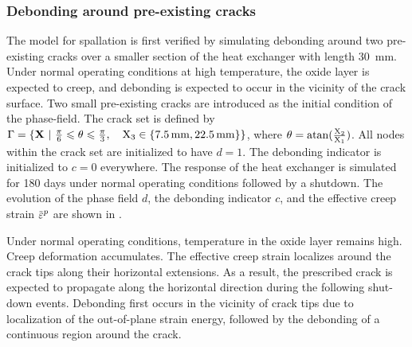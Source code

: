 

\subsubsection{Debonding around pre-existing cracks}

The model for spallation is first verified by simulating debonding around two pre-existing cracks over a smaller section of the heat exchanger with length \SI{30}{\milli\meter}. Under normal operating conditions at high temperature, the oxide layer is expected to creep, and debonding is expected to occur in the vicinity of the crack surface.
Two small pre-existing cracks are introduced as the initial condition of the phase-field. The crack set is defined by $\Gamma = \{ \textbf{X} \ \vert\ \frac{\pi}{6} \leqslant \theta \leqslant \frac{\pi}{3}, \quad \text{X}_3 \in \{ \SI{7.5}{\milli\meter}, \SI{22.5}{\milli\meter} \} \}$, where $\theta = \operatorname{atan}(\frac{\text{X}_2}{\text{X}_1})$.
All nodes within the crack set are initialized to have $d = 1$. The debonding indicator is initialized to $c = 0$ everywhere.
The response of the heat exchanger is simulated for 180 days under normal operating conditions followed by a shutdown. The evolution of the phase field $d$, the debonding indicator $c$, and the effective creep strain $\ep$ are shown in .



Under normal operating conditions, temperature in the oxide layer remains high. Creep deformation accumulates. The effective creep strain localizes around the crack tips along their horizontal extensions. As a result, the prescribed crack is expected to propagate along the horizontal direction during the following shut-down events. Debonding first occurs in the vicinity of crack tips due to localization of the out-of-plane strain energy, followed by the debonding of a continuous region around the crack.

